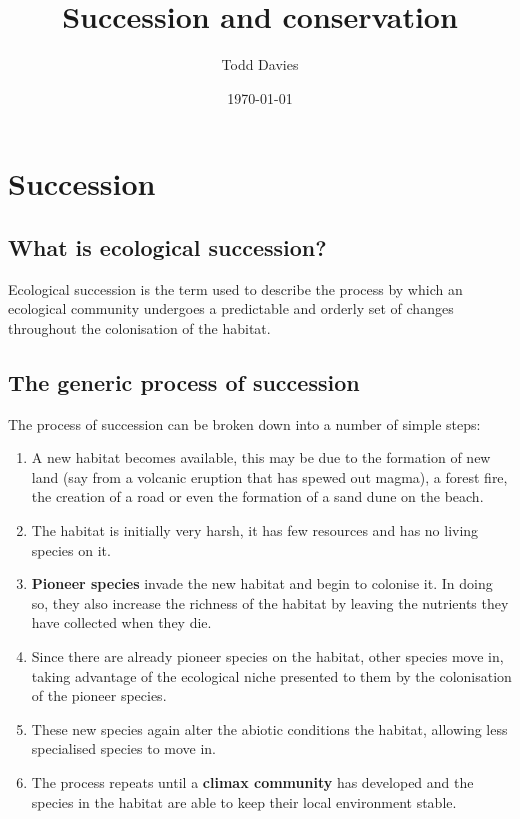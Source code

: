 \documentclass{article}
\title{Succession and conservation}
\author{Todd Davies}
\date{\today}
\begin{document}
\lhead{\today}

\maketitle

\section*{Succession}

\subsection*{What is ecological succession?}
\thispagestyle{empty}
Ecological succession is the term used to describe the process by which an ecological community undergoes a predictable and orderly set of changes throughout the colonisation of the habitat.

\subsection*{The generic process of succession}
The process of succession can be broken down into a number of simple steps:
\begin{enumerate}
	\item A new habitat becomes available, this may be due to the formation of new land (say from a volcanic eruption that has spewed out magma), a forest fire, the creation of a road or even the formation of a sand dune on the beach.
	\item The habitat is initially very harsh, it has few resources and has no living species on it.
	\item \textbf{Pioneer species} invade the new habitat and begin to colonise it. In doing so, they also increase the richness of the habitat by leaving the nutrients they have collected when they die.
	\item Since there are already pioneer species on the habitat, other species move in, taking advantage of the ecological niche presented to them by the colonisation of the pioneer species.
	\item These new species again alter the abiotic conditions the habitat, allowing less specialised species to move in.
	\item The process repeats until a \textbf{climax community} has developed and the species in the habitat are able to keep their local environment stable.
\end{enumerate}
\end{document}
